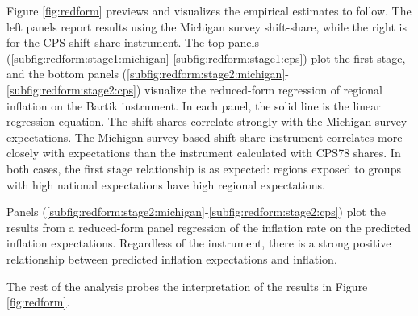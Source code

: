 \documentclass[12pt]{article}
\begin{document}
Figure \ref{fig:redform} previews and visualizes the empirical estimates to follow. The left panels report results using the Michigan survey shift-share, while the right is for the CPS shift-share instrument. The top panels (\ref{subfig:redform:stage1:michigan}-\ref{subfig:redform:stage1:cps}) plot the first stage, and the bottom panels (\ref{subfig:redform:stage2:michigan}-\ref{subfig:redform:stage2:cps}) visualize the reduced-form regression of regional inflation on the Bartik instrument. In each panel, the solid line is the linear regression equation. The shift-shares correlate strongly with the Michigan survey expectations. The Michigan survey-based shift-share instrument correlates more closely with expectations than the instrument calculated with CPS78 shares.  In both cases, the first stage relationship is as expected: regions exposed to groups with high national expectations have high regional expectations.

Panels (\ref{subfig:redform:stage2:michigan}-\ref{subfig:redform:stage2:cps}) plot the results from a reduced-form panel regression of the inflation rate on the predicted inflation expectations. Regardless of the instrument, there is a strong positive relationship between predicted inflation expectations and inflation.

The rest of the analysis probes the interpretation of the results in Figure \ref{fig:redform}.
\end{document}
